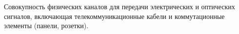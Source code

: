 Совокупность физических каналов для передачи электрических и
оптических сигналов, включающая телекоммуникационные кабели и
коммутационные элементы (панели, розетки).